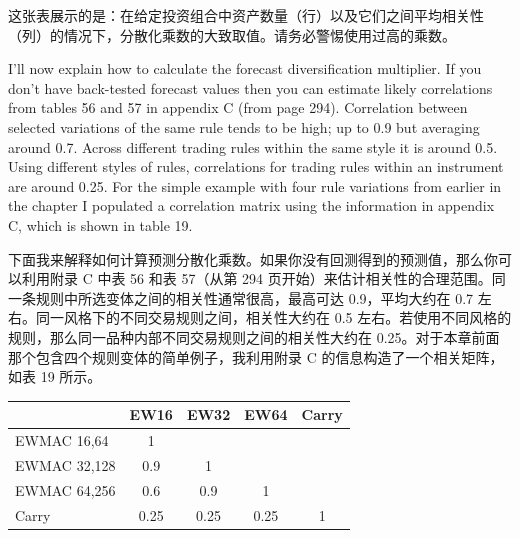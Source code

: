 \begin{chineseblock}这张表展示的是：在给定投资组合中资产数量（行）以及它们之间平均相关性（列）的情况下，分散化乘数的大致取值。请务必警惕使用过高的乘数。\end{chineseblock}

\bipairgap

\begin{englishblock} I'll now explain how to calculate the forecast diversification multiplier. If you don't have back-tested forecast values then you can estimate likely correlations from tables 56 and 57 in appendix C (from page 294). Correlation between selected variations of the same rule tends to be high; up to 0.9 but averaging around 0.7. Across different trading rules within the same style it is around 0.5. Using different styles of rules, correlations for trading rules within an instrument are around 0.25. For the simple example with four rule variations from earlier in the chapter I populated a correlation matrix using the information in appendix C, which is shown in table 19. \end{englishblock}

\begin{chineseblock}下面我来解释如何计算预测分散化乘数。如果你没有回测得到的预测值，那么你可以利用附录 C 中表 56 和表 57（从第 294 页开始）来估计相关性的合理范围。同一条规则中所选变体之间的相关性通常很高，最高可达 0.9，平均大约在 0.7 左右。同一风格下的不同交易规则之间，相关性大约在 0.5 左右。若使用不同风格的规则，那么同一品种内部不同交易规则之间的相关性大约在 0.25。对于本章前面那个包含四个规则变体的简单例子，我利用附录 C 的信息构造了一个相关矩阵，如表 19 所示。\end{chineseblock}

\begin{chinesetableblock} \begingroup \small \centering \begin{tabular}{@{} lcccc@{}}
\toprule
& EW16 & EW32 & EW64 & Carry \\
\midrule
EWMAC 16,64 & 1 & & & \\
EWMAC 32,128 & 0.9 & 1 & & \\
EWMAC 64,256 & 0.6 & 0.9 & 1 & \\
Carry & 0.25 & 0.25 & 0.25 & 1 \\
\bottomrule
\end{tabular}
\par \endgroup \end{chinesetableblock}

